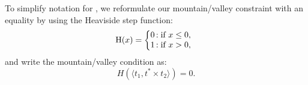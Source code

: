 To simplify notation for , we reformulate our mountain/valley constraint with an equality by using the Heaviside step function:
\begin{equation} \label{eq:heaviside}
\text{H}(x) = \left\{
     \begin{array}{@{}l@{\thinspace}l}
       0  &: \text{if } x \leq 0, \\
       1 &: \text{if } x > 0, \\
     \end{array}
   \right.
\end{equation}
and write the mountain/valley condition as:
\begin{equation} \label{eq:mountain_valley}
H(\langle t_1, t^* \times t_2 \rangle) = 0.
\end{equation}